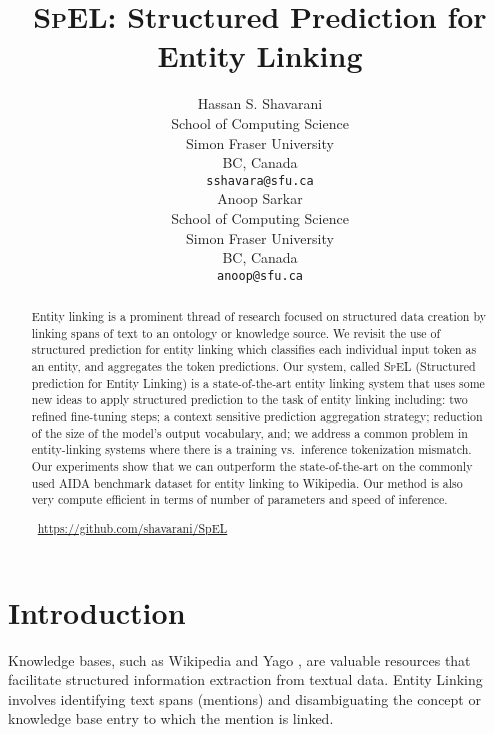 \documentclass[11pt]{article}
\title{\textsc{SpEL}: Structured Prediction for Entity Linking}
\author{Hassan S. Shavarani \\
  School of Computing Science \\
  Simon Fraser University \\
  BC, Canada \\
  \texttt{sshavara@sfu.ca} \\\And
  Anoop Sarkar \\
  School of Computing Science \\
  Simon Fraser University\\
  BC, Canada \\
  \texttt{anoop@sfu.ca} \\}
\begin{document}
\maketitle
\begin{abstract}
Entity linking is a prominent thread of research focused on structured data creation by linking spans of text to an ontology or knowledge source. We revisit the use of structured prediction for entity linking which classifies each individual input token as an entity, and aggregates the token predictions. Our system, called \textsc{SpEL} (Structured prediction for Entity Linking) is a state-of-the-art entity linking system that uses some new ideas to apply structured prediction to the task of entity linking including: two refined fine-tuning steps; a context sensitive prediction aggregation strategy; reduction of the size of the model's output vocabulary, and; we address a common problem in entity-linking systems where there is a training vs.\ inference tokenization mismatch. Our experiments show that we can outperform the state-of-the-art on the commonly used AIDA benchmark dataset for entity linking to Wikipedia. Our method is also very compute efficient in terms of number of parameters and speed of inference.

\faGithub\ \href{https://github.com/shavarani/SpEL}{https://github.com/shavarani/SpEL}

\end{abstract}

\section{Introduction}


Knowledge bases, such as Wikipedia and Yago \cite{YAGO4}, are valuable resources that facilitate structured information extraction from textual data. 
Entity Linking \cite{TKDE14} involves identifying text spans (mentions) and disambiguating the concept or knowledge base entry to which the mention is linked. 
\end{document}
